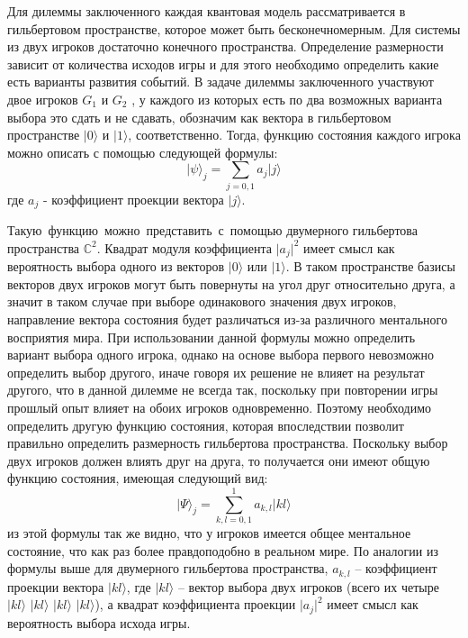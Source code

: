 
Для дилеммы заключенного каждая квантовая модель рассматривается в гильбертовом пространстве, которое
может быть бесконечномерным.
Для системы из двух игроков достаточно конечного пространства.
Определение размерности зависит от количества исходов игры и для этого необходимо определить какие
есть варианты развития событий.
В задаче дилеммы заключенного участвуют двое игроков $G_{1}$ и $G_{2}$ , у каждого из которых есть по два возможных
варианта выбора это сдать и не сдавать, обозначим как вектора в гильбертовом пространстве
$\vert 0 \rangle$ и $\vert 1 \rangle$, соответственно.
Тогда, функцию состояния каждого игрока можно описать с помощью следующей формулы:
\begin{equation}
    \vert \psi \rangle_{j} = \sum_{j=0,1} a_{j} \vert j \rangle
\end{equation}
где $a_{j}$ - коэффициент проекции вектора $\vert j \rangle$.

Такую~функцию~можно~представить~с~помощью двумерного гильбертова пространства $\mathbb{C}^{2}$.
Квадрат модуля коэффициента $\vert a_{j} \vert^{2}$ имеет смысл как вероятность выбора одного из
векторов $\vert 0 \rangle$ или $\vert 1 \rangle$.
В таком пространстве базисы векторов двух игроков могут быть повернуты на угол друг относительно друга,
а значит в таком случае при выборе одинакового значения двух игроков, направление вектора состояния
будет различаться из-за различного ментального восприятия мира.
При использовании данной формулы можно определить вариант выбора одного игрока, однако на основе
выбора первого невозможно определить выбор другого, иначе говоря их решение не влияет на результат
другого, что в данной дилемме не всегда так, поскольку при повторении игры прошлый опыт влияет на
обоих игроков одновременно.
Поэтому необходимо определить другую функцию состояния, которая впоследствии позволит правильно
определить размерность гильбертова пространства.
Поскольку выбор двух игроков должен влиять друг на друга, то получается они имеют общую функцию
состояния, имеющая следующий вид:
\begin{equation}
    \vert \Psi \rangle_{j} = \sum_{k,l=0,1}^{1} a_{k,l} \vert kl \rangle
\end{equation}
из этой формулы так же видно, что у игроков имеется общее ментальное состояние, что как раз более
правдоподобно в реальном мире.
По аналогии из формулы выше для двумерного гильбертова пространства, $a_{k,l}$ – коэффициент
проекции вектора $\vert kl \rangle$, где $\vert kl \rangle$ – вектор выбора двух игроков
(всего их четыре $\vert kl \rangle$ $\vert kl \rangle$ $\vert kl \rangle$ $\vert kl \rangle$),
а квадрат коэффициента проекции $\vert a_{j} \vert^{2}$ имеет смысл как вероятность выбора исхода игры.
